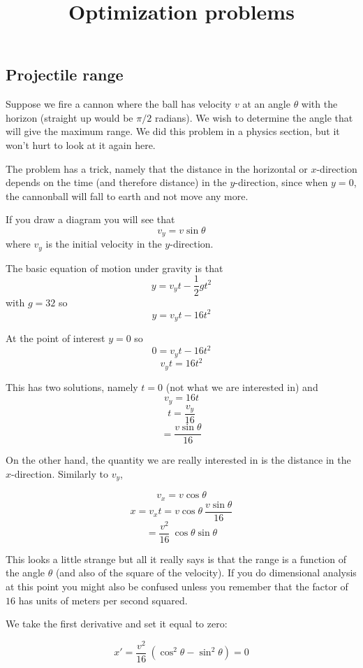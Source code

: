\documentclass[11pt, oneside]{article}
\title{Optimization problems}
\date{}
\begin{document}
\maketitle
\Large


\subsection*{Projectile range}

Suppose we fire a cannon where the ball has velocity $v$ at an angle $\theta$ with the horizon (straight up would be $\pi/2$ radians).  We wish to determine the angle that will give the maximum range.  We did this problem in a physics section, but it won't hurt to look at it again here.

The problem has a trick, namely that the distance in the horizontal or $x$-direction depends on the time (and therefore distance) in the $y$-direction, since when $y=0$, the cannonball will fall to earth and not move any more.

If you draw a diagram you will see that 
\[ v_y = v \sin \theta \]
where $v_y$ is the initial velocity in the $y$-direction.

The basic equation of motion under gravity is that 
\[ y = v_y t - \frac{1}{2}gt^2 \]
with $g=32$ so
\[ y = v_y t - 16t^2 \]

At the point of interest $y=0$ so
\[ 0 = v_y t - 16t^2 \]
\[ v_y t = 16 t^2 \]

This has two solutions, namely $t=0$ (not what we are interested in) and
\[ v_y = 16 t \]
\[ t = \frac{v_y}{16} \]
\[ = \frac{v \sin \theta}{16} \]

On the other hand, the quantity we are really interested in is the distance in the $x$-direction.  Similarly to $v_y$, 

\[ v_x = v \cos \theta \]
\[ x = v_x t = v \cos \theta \ \frac{v \sin \theta}{16} \]
\[ = \frac{v^2}{16} \ \cos \theta \sin \theta \]

This looks a little strange but all it really says is that the range is a function of the angle $\theta$ (and also of the square of the velocity).  If you do dimensional analysis at this point you might also be confused unless you remember that the factor of $16$ has units of meters per second squared.

We take the first derivative and set it equal to zero:

\[ x' = \frac{v^2}{16} \ (\cos^2 \theta - \sin^2 \theta ) = 0 \]
\end{document}
